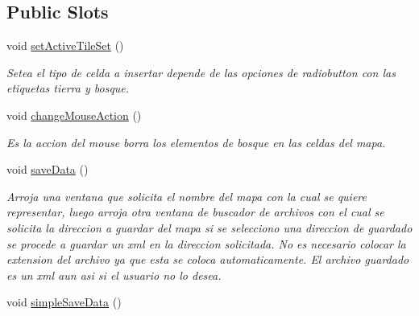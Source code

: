 \subsection*{Public Slots}
\begin{DoxyCompactItemize}
\item 
\hypertarget{class_map_maker_a9947055f482f31c770769b952e53bf67}{void \hyperlink{class_map_maker_a9947055f482f31c770769b952e53bf67}{set\-Active\-Tile\-Set} ()}\label{class_map_maker_a9947055f482f31c770769b952e53bf67}

\begin{DoxyCompactList}\small\item\em Setea el tipo de celda a insertar depende de las opciones de radiobutton con las etiquetas tierra y bosque. \end{DoxyCompactList}\item 
\hypertarget{class_map_maker_a9a8bba5beafacbb6432fc1d7013548fe}{void \hyperlink{class_map_maker_a9a8bba5beafacbb6432fc1d7013548fe}{change\-Mouse\-Action} ()}\label{class_map_maker_a9a8bba5beafacbb6432fc1d7013548fe}

\begin{DoxyCompactList}\small\item\em Es la accion del mouse borra los elementos de bosque en las celdas del mapa. \end{DoxyCompactList}\item 
\hypertarget{class_map_maker_a8e4f57b9449a8655c3edf8dd3f5c219d}{void \hyperlink{class_map_maker_a8e4f57b9449a8655c3edf8dd3f5c219d}{save\-Data} ()}\label{class_map_maker_a8e4f57b9449a8655c3edf8dd3f5c219d}

\begin{DoxyCompactList}\small\item\em Arroja una ventana que solicita el nombre del mapa con la cual se quiere representar, luego arroja otra ventana de buscador de archivos con el cual se solicita la direccion a guardar del mapa si se selecciono una direccion de guardado se procede a guardar un xml en la direccion solicitada. No es necesario colocar la extension del archivo ya que esta se coloca automaticamente. El archivo guardado es un xml aun asi si el usuario no lo desea. \end{DoxyCompactList}\item 
\hypertarget{class_map_maker_a6460a1ae322e8484240ddde66bc57144}{void \hyperlink{class_map_maker_a6460a1ae322e8484240ddde66bc57144}{simple\-Save\-Data} ()}\label{class_map_maker_a6460a1ae322e8484240ddde66bc57144}


\end{DoxyCompactItemize}
